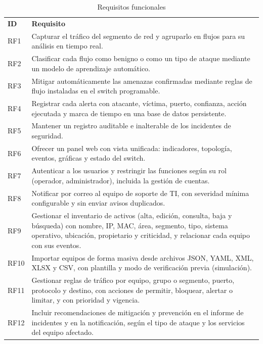 \begin{table}[H]
\centering
\footnotesize
\renewcommand{\arraystretch}{1.0}
\caption{{\fontsize{11pt}{13}\selectfont Requisitos funcionales}}
\label{tbl:rf}
\begin{tabular}{@{}L{1.1cm}L{14.7cm}@{}}
\textbf{ID} & \textbf{Requisito} \\
RF1 & Capturar el tráfico del segmento de red y agruparlo en flujos para su análisis en tiempo real. \\
RF2 & Clasificar cada flujo como benigno o como un tipo de ataque mediante un modelo de aprendizaje automático. \\
RF3 & Mitigar automáticamente las amenazas confirmadas mediante reglas de flujo instaladas en el switch programable. \\
RF4 & Registrar cada alerta con atacante, víctima, puerto, confianza, acción ejecutada y marca de tiempo en una base de datos persistente. \\
RF5 & Mantener un registro auditable e inalterable de los incidentes de seguridad. \\
RF6 & Ofrecer un panel web con vista unificada: indicadores, topología, eventos, gráficas y estado del switch. \\
RF7 & Autenticar a los usuarios y restringir las funciones según su rol (operador, administrador), incluida la gestión de cuentas. \\
RF8 & Notificar por correo al equipo de soporte de TI, con severidad mínima configurable y sin enviar avisos duplicados. \\
RF9 & Gestionar el inventario de activos (alta, edición, consulta, baja y búsqueda) con nombre, IP, MAC, área, segmento, tipo, sistema operativo, ubicación, propietario y criticidad, y relacionar cada equipo con sus eventos. \\
RF10 & Importar equipos de forma masiva desde archivos JSON, YAML, XML, XLSX y CSV, con plantilla y modo de verificación previa (simulación). \\
RF11 & Gestionar reglas de tráfico por equipo, grupo o segmento, puerto, protocolo y destino, con acciones de permitir, bloquear, alertar o limitar, y con prioridad y vigencia. \\
RF12 & Incluir recomendaciones de mitigación y prevención en el informe de incidentes y en la notificación, según el tipo de ataque y los servicios del equipo afectado. \\
\end{tabular}
\end{table}

